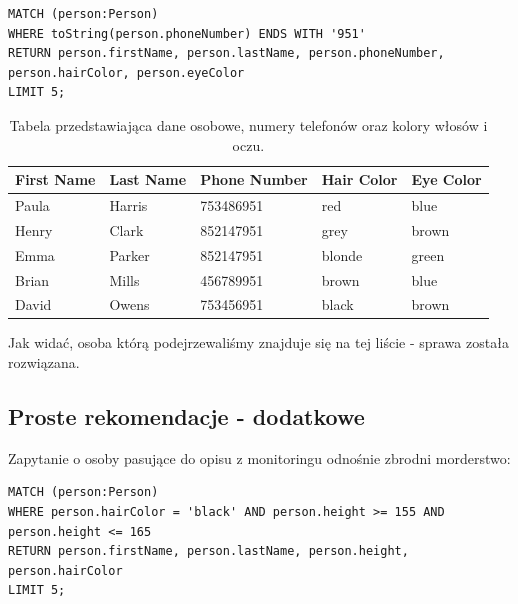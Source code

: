 \documentclass[a4paper,12pt]{article}
\begin{document}
\begin{center}
\begin{minipage}{0.8\linewidth}
\begin{lstlisting}[language=Cypher, basicstyle=\small, breaklines=true]
MATCH (person:Person)
WHERE toString(person.phoneNumber) ENDS WITH '951'
RETURN person.firstName, person.lastName, person.phoneNumber, person.hairColor, person.eyeColor
LIMIT 5;
\end{lstlisting}
\end{minipage}
\end{center}
\newpage
\begin{table}[h!]
\centering
\begin{tabular}{|l|l|l|l|l|}
\hline
\textbf{First Name} & \textbf{Last Name} & \textbf{Phone Number} & \textbf{Hair Color} & \textbf{Eye Color} \\ \hline
Paula              & Harris             & 753486951             & red                 & blue               \\ \hline
Henry              & Clark              & 852147951             & grey                & brown              \\ \hline
Emma               & Parker             & 852147951             & blonde              & green              \\ \hline
Brian              & Mills              & 456789951             & brown               & blue               \\ \hline
David              & Owens              & 753456951             & black               & brown              \\ \hline
\end{tabular}
\caption{Tabela przedstawiająca dane osobowe, numery telefonów oraz kolory włosów i oczu.}
\label{tab:person_data}
\end{table}

Jak widać, osoba którą podejrzewaliśmy znajduje się na tej liście - sprawa została rozwiązana.

\subsection{Proste rekomendacje - dodatkowe}

Zapytanie o osoby pasujące do opisu z monitoringu odnośnie zbrodni morderstwo:

\begin{center}
\begin{minipage}{0.8\linewidth}
\begin{lstlisting}[language=Cypher, basicstyle=\small, breaklines=true]
MATCH (person:Person)
WHERE person.hairColor = 'black' AND person.height >= 155 AND person.height <= 165
RETURN person.firstName, person.lastName, person.height, person.hairColor
LIMIT 5;
\end{lstlisting}
\end{minipage}
\end{center}
\end{document}
